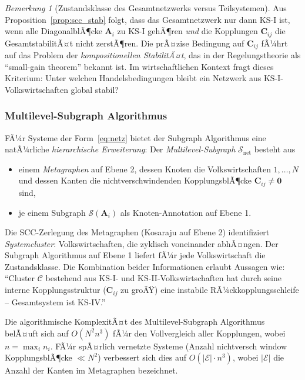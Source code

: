 ﻿\documentclass[12pt, a4paper, titlepage]{report}
\theoremstyle{definition}
\theoremstyle{remark}
\newtheorem{remark}[theorem]{Bemerkung}
\newcommand{\vA}{\bm{A}}
\newcommand{\vC}{\bm{C}}
\begin{document}
\begin{remark}[Zustandsklasse des Gesamtnetzwerks versus Teilsystemen]
Aus Proposition~\ref{prop:scc_stab} folgt, dass das Gesamtnetzwerk nur dann KS-I ist,
wenn alle DiagonalblÃ¶cke $\vA_i$ zu KS-I gehÃ¶ren \emph{und} die Kopplungen $\vC_{ij}$
die GesamtstabilitÃ¤t nicht zerstÃ¶ren. Die prÃ¤zise Bedingung auf $\vC_{ij}$ fÃ¼hrt auf
das Problem der \emph{kompositionellen StabilitÃ¤t}, das in der Regelungstheorie als
``small-gain theorem'' bekannt ist. Im wirtschaftlichen Kontext fragt dieses Kriterium:
Unter welchen Handelsbedingungen bleibt ein Netzwerk aus KS-I-Volkswirtschaften global stabil?
\end{remark}

\subsubsection*{Multilevel-Subgraph Algorithmus}

FÃ¼r Systeme der Form~\eqref{eq:netz} bietet der Subgraph Algorithmus eine natÃ¼rliche
\emph{hierarchische Erweiterung}: Der \emph{Multilevel-Subgraph} $\mathcal{S}_{\mathrm{net}}$
besteht aus
\begin{itemize}
  \item einem \emph{Metagraphen} auf Ebene 2, dessen Knoten die Volkswirtschaften
    $1, \ldots, N$ und dessen Kanten die nichtver\-schwindenden KopplungsblÃ¶cke
    $\vC_{ij} \neq \bm{0}$ sind,
  \item je einem Subgraph $\mathcal{S}(\vA_i)$ als Knoten-Annotation auf Ebene 1.
\end{itemize}
Die SCC-Zerlegung des Metagraphen (Kosaraju auf Ebene 2) identifiziert
\emph{Systemcluster}: Volkswirtschaften, die zyklisch voneinander abhÃ¤ngen. Der
Subgraph Algorithmus auf Ebene 1 liefert fÃ¼r jede Volkswirtschaft die Zustandsklasse.
Die Kombination beider Informationen erlaubt Aussagen wie: ``Cluster $\mathcal{C}$
bestehend aus KS-I- und KS-II-Volkswirtschaften hat durch seine interne Kopplungsstruktur
($\vC_{ij}$ zu groÃŸ) eine instabile RÃ¼ckkopplungsschleife -- Gesamtsystem ist KS-IV.''

Die algorithmische KomplexitÃ¤t des Multilevel-Subgraph Algorithmus belÃ¤uft sich auf
$O(N^2 n^3)$ fÃ¼r den Vollvergleich aller Kopplungen, wobei $n = \max_i n_i$.
FÃ¼r spÃ¤rlich vernetzte Systeme (Anzahl nichtversch window KopplungsblÃ¶cke $\ll N^2$)
verbessert sich dies auf $O(|\mathcal{E}| \cdot n^3)$, wobei $|\mathcal{E}|$ die
Anzahl der Kanten im Metagraphen bezeichnet.
\end{document}
